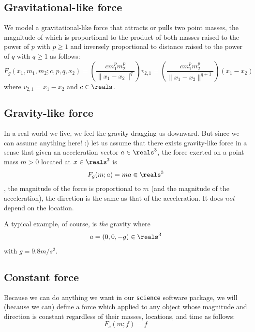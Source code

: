 \documentclass{article}
\begin{document}
\subsection{Gravitational-like force}

We model a gravitational-like force that attracts or pulls two point masses,
the magnitude of which is proportional to the product of both masses raised to the power of $p$ with $p\geq1$
and inversely proportional to distance raised to the power of $q$ with $q\geq1$ as follows:
\begin{equation}
\label{eq:force:gravitational-like}
	F_g(x_1,m_1,m_2;c,p,q,x_2)
	= \left(\frac{c m_1^pm_2^p}{\|x_1-x_2\|^q} \right) v_{2,1}
	= \left(\frac{c m_1^pm_2^p}{\|x_1-x_2\|^{q+1}} \right) (x_1-x_2)
\end{equation}
where $v_{2,1} = x_1-x_2$ and $c\in\reals$.

\subsection{Gravity-like force}

In a real world we live, we feel the gravity dragging us downward.
But since we can assume anything here! :)
let us assume that there exists gravity-like force
in a sense that given an acceleration vector $a\in\reals^3$,
the force exerted on a point mass $m>0$ located at $x\in\reals^3$
is
\begin{equation}
\label{eq:force:gravity-like}
F_g(m;a) = ma
	\in\reals^3
\end{equation}
\ie,
the magnitude of the force is proportional to $m$ (and the magnitude of the acceleration),
the direction is the same as that of the acceleration.
It does \emph{not} depend on the location.

A typical example, of course, is \emph{the} gravity where
\[
	a = (0,0,-g)
	\in\reals^3
\]
with $g = 9.8 m/s^2$.

\subsection{Constant force}

Because we can do anything we want in our {\tt science} software package,
we will (because we can) define a force which applied to any object
whose magnitude and direction is constant regardless of their masses, locations, and time
as follows:
\begin{equation}
\label{eq:force:constant}
	F_c(m;f) = f
\end{equation}
\end{document}
